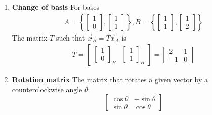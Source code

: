 \documentclass[10pt]{article}
\begin{document}
\begin{multicols}{2}
\begin{enumerate}
    \item \textbf{Change of basis}     
    For bases
    \begin{align*}
        A= \left\{ \begin{bmatrix} 1 \\ 0 \end{bmatrix}, \begin{bmatrix} 1 \\ 1 \end{bmatrix} \right\}, 
        B= \left\{ \begin{bmatrix} 1 \\ 1 \end{bmatrix}, \begin{bmatrix} 1 \\ 2 \end{bmatrix} \right\}
    \end{align*}
    The matrix $T$ such that $\vec{x}_B=T\vec{x}_A$ is 
    \begin{align*}
        T=\begin{bmatrix}
        \begin{bmatrix} 1 \\ 0 \end{bmatrix}_B & \begin{bmatrix} 1 \\ 1 \end{bmatrix}_B 
        \end{bmatrix} =
        \begin{bmatrix}
        2 & 1 \\ -1 & 0 
        \end{bmatrix}
    \end{align*}
    
    \item \textbf{Rotation matrix} The matrix that rotates a given vector by a counterclockwise angle $\theta$: 
    \begin{equation*}
        \begin{bmatrix} 
        \cos{\theta} & -\sin{\theta} \\
        \sin{\theta} & \cos{\theta}
        \end{bmatrix}
    \end{equation*}
\end{enumerate}
\end{multicols}
\end{document}
